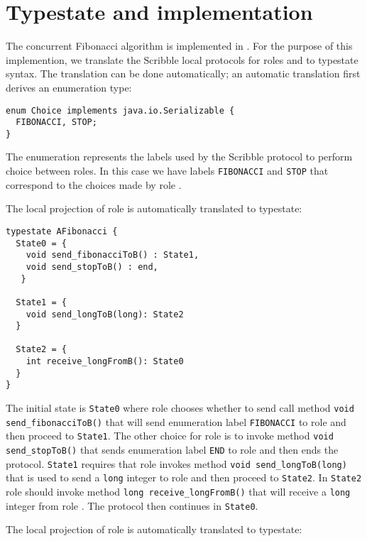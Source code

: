 \section{Typestate and \Mungo implementation}

The concurrent Fibonacci algorithm is implemented in \Mungo.
For the purpose of this implemention,
we translate the Scribble local protocols for roles
\A and \B to \Mungo typestate syntax.
The translation can be done automatically;
an automatic translation first derives an
enumeration type:

\begin{lstlisting}[caption={Enumeration for the communication choice}]
enum Choice implements java.io.Serializable {
  FIBONACCI, STOP;
}
\end{lstlisting}

The enumeration represents the
labels used by the Scribble protocol
to perform choice between roles. In this
case we have labels \lstinline|FIBONACCI| and
\lstinline|STOP| that correspond to the choices
made by role \A.

The local projection of role \A is automatically translated to typestate:

\begin{lstlisting}[caption={Typestate for Role \A}]
typestate AFibonacci {
  State0 = {
    void send_fibonacciToB() : State1,
    void send_stopToB() : end,
   }

  State1 = {
    void send_longToB(long): State2
  }

  State2 = {
    int receive_longFromB(): State0
  }
}
\end{lstlisting}

The initial state is \lstinline|State0| where
role \A chooses whether to send call method
\lstinline|void send_fibonacciToB()| that
will send enumeration label \lstinline|FIBONACCI| to role \B
and then proceed to \lstinline|State1|. The other
choice for role \A is to invoke method
\lstinline|void send_stopToB()| that sends
enumeration label \lstinline|END| to role \B
and then ends the protocol.
\lstinline|State1| requires that role \A invokes
method \lstinline|void send_longToB(long)| that
is used to send a \lstinline|long| integer to role
\B and then proceed to \lstinline|State2|. In 
\lstinline|State2| role \A should invoke method
\lstinline|long receive_longFromB()| that will
receive a \lstinline|long| integer from role \B.
The protocol then continues in \lstinline|State0|.


The local projection of role \B is automatically translated to typestate:

